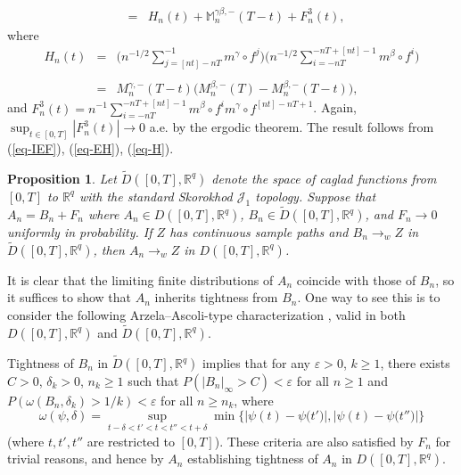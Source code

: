\documentclass[aop,MSNbibl,seceqn,dvips]{arximspdf}
\newcommand{\eqref}[1]{(\ref{#1})}
\newtheorem{prop}[thmm]{Proposition}
\newcommand{\R}{\mathbb{R}}
\newcommand{\BBM}{\mathbb{M}}
\begin{document}
\begin{pf}
\begin{eqnarray}
\\[-8pt]
\\[-8pt]
\nonumber
& = &H_n(t)+\BBM_n^{\gamma\beta,-}(T-t)+F^3_n(t),
\end{eqnarray}
%
where
%
\begin{eqnarray}
\label{eq-H}
H_n(t) & =& \Biggl( n^{-{1}/2} \sum
_{j=[nt]-nT}^{-1} m^\gamma\circ
f^j \Biggr) \Biggl( n^{-{1}/2} \sum
_{i=-nT}^{-nT+[nt]-1} m^\beta\circ f^i
\Biggr)
\nonumber
\\[-8pt]
\\[-8pt]
\nonumber
& =& M_n^{\gamma,-}(T-t) \bigl(M_n^{\beta,-}(T)-M_n^{\beta
,-}(T-t)
\bigr),
\end{eqnarray}
%
and $F^3_n(t)=n^{-1}\sum_{i=-nT}^{-nT+[nt]-1}m^\beta\circ f^i
m^\gamma
\circ f^{[nt]-nT+1}$.
Again, $\sup_{t\in[0,T]}|F^3_n(t)|\to0$ a.e. by the ergodic theorem.
The result follows from \eqref{eq-IEF}, \eqref{eq-EH}, \eqref{eq-H}.
\end{pf}

\begin{prop} \label{prop-caglad}
Let
$\widetilde D([0,T],\R^q)$ denote the space of caglad functions from
$[0,T]$ to $\R^q$
with the standard Skorokhod $\mathcal{J}_1$ topology.
Suppose that $A_n=B_n+F_n$ where
$A_n\in D([0,T],\R^q)$,
$B_n\in\widetilde D([0,T],\R^q)$,
and $F_n\to0$ uniformly in probability.
If $Z$ has continuous sample paths and
$B_n\to_w Z$ in $\widetilde D([0,T],\R^q)$, then
$A_n\to_w Z$ in $D([0,T],\R^q)$.
\end{prop}

\begin{pf}
It is clear that the limiting finite distributions of $A_n$ coincide
with those
of $B_n$, so it suffices to show that $A_n$ inherits tightness from $B_n$.
One way to see this is to consider the following Arzela--Ascoli-type
characterization \cite{Skorokhod56}, valid in both $D([0,T],\R^q)$ and
$\widetilde D([0,T],\R^q)$.

Tightness of $B_n$ in $\widetilde D([0,T],\R^q)$ implies that
for any $\varepsilon>0$, $k\ge1$, there exists $C>0$, $\delta_k>0$,
$n_k\ge1$ such that $P(|B_n|_\infty>C) < \varepsilon$ for all $n\ge
1$ and
$P(\omega(B_n,\delta_k)>1/k) < \varepsilon$ for all $n\ge n_k$,
where
%
\[
\omega(\psi,\delta)=\sup_{t-\delta<t'<t<t''<t+\delta}\min\bigl\{\bigl|\psi (t)-\psi
\bigl(t'\bigr)\bigr|,\bigl|\psi(t)-\psi\bigl(t''
\bigr)\bigr|\bigr\}
\]
%
(where $t,t',t''$ are restricted to $[0,T]$).
These criteria are also satisfied by $F_n$ for trivial reasons, and hence
by $A_n$ establishing tightness of $A_n$ in $D([0,T],\R^q)$.
\end{pf}
\end{document}
